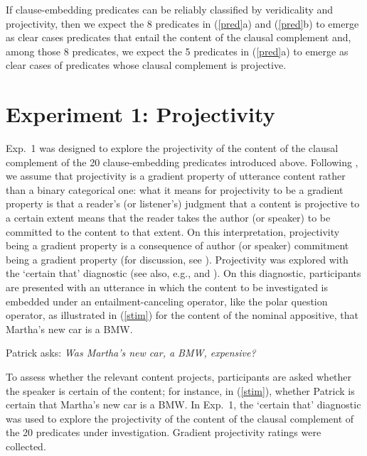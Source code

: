 \documentclass[11pt,fleqn]{article}
\newcommand{\6}{\mbox{$[\hspace*{-.6mm}[$}}
\newcommand{\9}{\mbox{$]\hspace*{-.6mm}]$}}
\begin{document}
If clause-embedding predicates can be reliably classified by veridicality and projectivity, then we expect the 8 predicates in (\ref{pred}a) and (\ref{pred}b) to emerge as clear cases predicates that entail the content of the clausal complement and, among those 8 predicates, we expect the 5 predicates in (\ref{pred}a) to emerge as clear cases of predicates whose clausal complement is projective.

\section{Experiment 1: Projectivity}\label{s2}

Exp.~1 was designed to explore the projectivity of the content of the clausal complement of the 20 clause-embedding predicates introduced above. Following \citealt{tbd-variability}, we assume that projectivity is a gradient property of utterance content rather than a binary categorical one: what it means for projectivity to be a gradient property is that a reader's (or listener's) judgment that a content is projective to a certain extent means that the reader takes the author (or speaker) to be committed to the content to that extent. On this interpretation, projectivity being a gradient property is a consequence of author (or speaker) commitment being a gradient property (for discussion, see \citealt{tbd-variability}). Projectivity was explored with the `certain that' diagnostic (see also, e.g., \citealt{tonhauser-salt26,djaerv-bacovcin-salt27,stevens-etal2017} and \citealt{tbd-variability}). On this diagnostic, participants are presented with an utterance in which the content to be investigated is embedded under an entailment-canceling operator, like the polar question operator, as illustrated in (\ref{stim}) for the content of the nominal appositive, that Martha's new car is a BMW.

\begin{exe}

\ex\label{stim} Patrick asks: {\em Was Martha's new car, a BMW, expensive?} 

\end{exe}
To assess whether the relevant content projects, participants are asked whether the speaker is certain of the content; for instance, in (\ref{stim}), whether Patrick is certain that Martha's new car is a BMW. In Exp.~1, the `certain that' diagnostic was used to explore the projectivity of the content of the clausal complement of the 20 predicates under investigation. Gradient projectivity ratings were collected.
\end{document}
